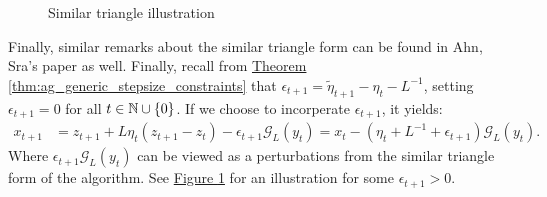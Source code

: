 \documentclass[12pt]{article}
\begin{document}
\begin{remark}
\begin{figure}[h]
{                    \label{fig:1b}
                }
                \caption{Similar triangle illustration}
            \end{figure}
            Finally, similar remarks about the similar triangle form can be found in Ahn, Sra's paper \cite{ahn_understanding_2022} as well. 
            Finally, recall from 
            \hyperref[thm:ag_generic_stepsize_constraints]
            {Theorem \ref*{thm:ag_generic_stepsize_constraints}}
            that $\epsilon_{t + 1} = \tilde \eta_{t + 1} - \eta_t - L^{-1}$, setting $\epsilon_{t + 1} =0$ for all $t \in \mathbb N \cup \{0\}$. 
            If we choose to incorperate $\epsilon_{t + 1}$, it yields: 
            \begin{align*}
                x_{t + 1} &= z_{t + 1} + L\eta_t(z_{t + 1} - z_t) - \epsilon_{t + 1}\mathcal G_L(y_t) = x_t - (\eta_t + L^{-1} + \epsilon_{t + 1})\mathcal G_L(y_t). 
            \end{align*}
            Where $\epsilon_{t + 1}\mathcal G_L(y_t)$ can be viewed as a perturbations from the similar triangle form of the algorithm. 
            See 
            \hyperref[fig:1b]{Figure \ref*{fig:1b}}
            for an illustration for some $\epsilon_{t + 1} > 0$. 
        \end{remark} 
    
        
\end{document}
